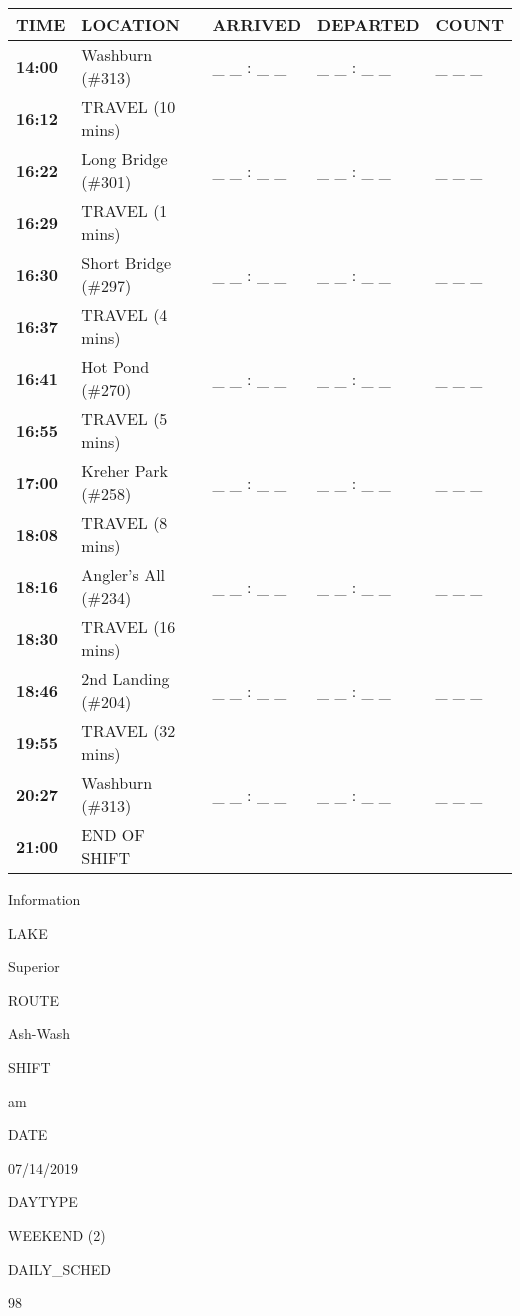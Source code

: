 \documentclass[]{article}
\begin{document}
\begin{tabular}{>{\bfseries}lllll}
\toprule
\textbf{TIME} & \textbf{LOCATION} & \textbf{ARRIVED} & \textbf{DEPARTED} & \textbf{COUNT}\\
\midrule
14:00 & Washburn (\#313) & \_ \_ : \_ \_ & \_ \_ : \_ \_ & \_ \_ \_\\
16:12 & TRAVEL (10 mins) &  &  & \\
16:22 & Long Bridge (\#301) & \_ \_ : \_ \_ & \_ \_ : \_ \_ & \_ \_ \_\\
16:29 & TRAVEL (1 mins) &  &  & \\
16:30 & Short Bridge (\#297) & \_ \_ : \_ \_ & \_ \_ : \_ \_ & \_ \_ \_\\
16:37 & TRAVEL (4 mins) &  &  & \\
16:41 & Hot Pond (\#270) & \_ \_ : \_ \_ & \_ \_ : \_ \_ & \_ \_ \_\\
16:55 & TRAVEL (5 mins) &  &  & \\
17:00 & Kreher Park (\#258) & \_ \_ : \_ \_ & \_ \_ : \_ \_ & \_ \_ \_\\
18:08 & TRAVEL (8 mins) &  &  & \\
18:16 & Angler's All (\#234) & \_ \_ : \_ \_ & \_ \_ : \_ \_ & \_ \_ \_\\
18:30 & TRAVEL (16 mins) &  &  & \\
18:46 & 2nd Landing (\#204) & \_ \_ : \_ \_ & \_ \_ : \_ \_ & \_ \_ \_\\
19:55 & TRAVEL (32 mins) &  &  & \\
20:27 & Washburn (\#313) & \_ \_ : \_ \_ & \_ \_ : \_ \_ & \_ \_ \_\\
21:00 & END OF SHIFT &  &  & \\
\bottomrule
\end{tabular}\newpage

Information

LAKE

Superior

ROUTE

Ash-Wash

SHIFT

am

DATE

07/14/2019

DAYTYPE

WEEKEND (2)

DAILY\_SCHED

98

\vspace{24pt}
\end{document}
